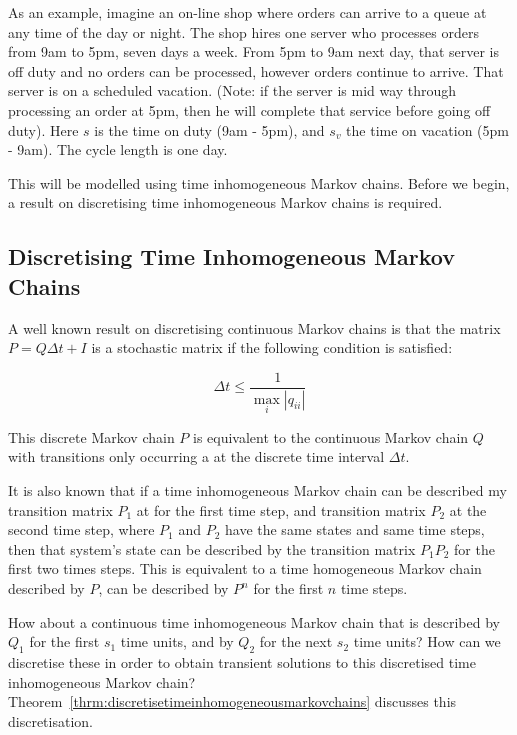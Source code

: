 \documentclass{article}
\begin{document}
As an example, imagine an on-line shop where orders can arrive to a queue at any time of the day or night.
The shop hires one server who processes orders from 9am to 5pm, seven days a week.
From 5pm to 9am next day, that server is off duty and no orders can be processed, however orders continue to arrive.
That server is on a scheduled vacation.
(Note: if the server is mid way through processing an order at 5pm, then he will complete that service before going off duty).
Here $s$ is the time on duty (9am - 5pm), and $s_v$ the time on vacation (5pm - 9am).
The cycle length is one day.

This will be modelled using time inhomogeneous Markov chains.
Before we begin, a result on discretising time inhomogeneous Markov chains is required.

\subsection{Discretising Time Inhomogeneous Markov Chains}

A well known result \cite{stewart09} on discretising continuous Markov chains is that the matrix $P = Q \Delta t + I$ is a stochastic matrix if the following condition is satisfied:

\begin{equation}
\Delta t \leq \frac{1}{\max_i |q_{ii}|}
\end{equation}

This discrete Markov chain $P$ is equivalent to the continuous Markov chain $Q$ with transitions only occurring a at the discrete time interval $\Delta t$.

It is also known that if a time inhomogeneous Markov chain can be described my transition matrix $P_1$ at for the first time step, and transition matrix $P_2$ at the second time step, where $P_1$ and $P_2$ have the same states and same time steps, then that system's state can be described by the transition matrix $P_1 P_2$ for the first two times steps.
This is equivalent to a time homogeneous Markov chain described by $P$, can be described by $P^n$ for the first $n$ time steps.

How about a continuous time inhomogeneous Markov chain that is described by $Q_1$ for the first $s_1$ time units, and by $Q_2$ for the next $s_2$ time units?
How can we discretise these in order to obtain transient solutions to this discretised time inhomogeneous Markov chain?
Theorem~\ref{thrm:discretisetimeinhomogeneousmarkovchains} discusses this discretisation.
\newline
\end{document}
